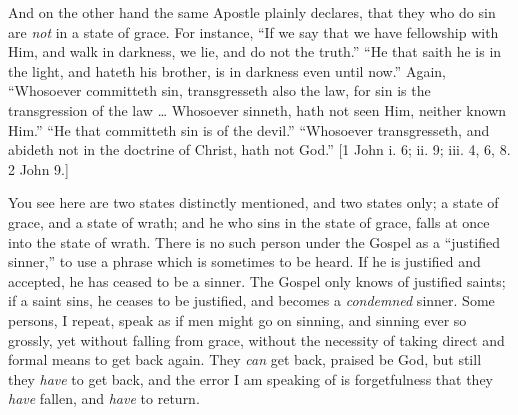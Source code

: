And on the other hand the same Apostle plainly declares, that they
who do sin are \emph{not} in a state of grace. For instance, ``If we say
that we have fellowship with Him, and walk in darkness, we lie, and do
not the truth.'' ``He that saith he is in the light, and
hateth his brother, is in darkness even until now.'' Again,
``Whosoever committeth sin, transgresseth also the law, for sin is
the transgression of the law … Whosoever sinneth, hath not seen Him,
neither known Him.'' ``He that committeth sin is of the
devil.'' ``Whosoever transgresseth, and abideth not in the
doctrine of Christ, hath not God.'' [1 John i. 6; ii. 9; iii. 4, 6,
8. 2 John 9.]

You see here are two states distinctly mentioned, and two states
only; a state of grace, and a state of wrath; and he who sins in the
state of grace, falls at once into the state of wrath. There is no
such person under the Gospel as a ``justified sinner,'' to use
a phrase which is sometimes to be heard. If he is justified and
accepted, he has ceased to be a sinner. The Gospel only knows of
justified saints; if a saint sins, he ceases to be justified, and
becomes a \emph{condemned} sinner. Some persons, I repeat, speak as if
men might go on sinning, and sinning ever so grossly, yet without
falling from grace, without the necessity of taking direct and formal
means to get back again. They \emph{can} get back, praised be God, but
still they \emph{have} to get back, and the error I am speaking of is
forgetfulness that they \emph{have} fallen, and \emph{have} to return.

